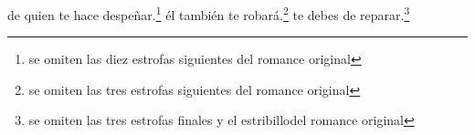 de quien te hace despeñar.\footnote{\textsuperscript{}se omiten las diez estrofas siguientes del romance original}
él también te robará.\footnote{\textsuperscript{}se omiten las tres estrofas siguientes del romance original}
te debes de reparar.\footnote{\textsuperscript{}se omiten las tres estrofas finales y el estribillodel romance original}

